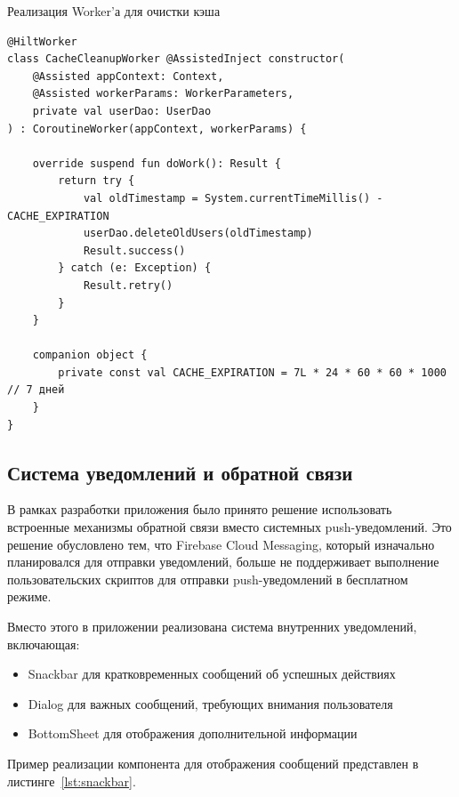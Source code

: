 \documentclass[14pt, russian]{scrartcl}
\begin{document}
\begin{listing}[!htb]
\caption{Реализация Worker'а для очистки кэша}
\vspace{-0.3cm}
\label{lst:worker}
\begin{verbatim}
@HiltWorker
class CacheCleanupWorker @AssistedInject constructor(
    @Assisted appContext: Context,
    @Assisted workerParams: WorkerParameters,
    private val userDao: UserDao
) : CoroutineWorker(appContext, workerParams) {

    override suspend fun doWork(): Result {
        return try {
            val oldTimestamp = System.currentTimeMillis() - CACHE_EXPIRATION
            userDao.deleteOldUsers(oldTimestamp)
            Result.success()
        } catch (e: Exception) {
            Result.retry()
        }
    }

    companion object {
        private const val CACHE_EXPIRATION = 7L * 24 * 60 * 60 * 1000 // 7 дней
    }
}
\end{verbatim}
\end{listing}

\subsection{Система уведомлений и обратной связи}\label{sect:notifications}

В рамках разработки приложения было принято решение использовать встроенные механизмы обратной связи вместо системных push-уведомлений. Это решение обусловлено тем, что Firebase Cloud Messaging, который изначально планировался для отправки уведомлений, больше не поддерживает выполнение пользовательских скриптов для отправки push-уведомлений в бесплатном режиме.

Вместо этого в приложении реализована система внутренних уведомлений, включающая:

\begin{itemize}
\item Snackbar для кратковременных сообщений об успешных действиях
\item Dialog для важных сообщений, требующих внимания пользователя
\item BottomSheet для отображения дополнительной информации
\end{itemize}

Пример реализации компонента для отображения сообщений представлен в листинге~\ref{lst:snackbar}.
\end{document}

